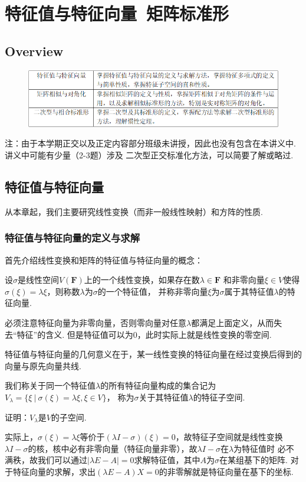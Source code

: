 \chapter{特征值与特征向量\ 矩阵标准形}

\section{Overview}
\begin{figure}[h]
	\centering
	\includegraphics[scale=0.58]{9.png}
\end{figure}
注：由于本学期正交以及正定内容部分班级未讲授，因此也没有包含在本讲义中.讲义中可能有少量（2-3题）涉及
二次型正交标准化方法，可以简要了解或略过.
\section{特征值与特征向量}
从本章起，我们主要研究线性变换（而非一般线性映射）和方阵的性质.
\subsection{特征值与特征向量的定义与求解}
首先介绍线性变换和矩阵的特征值与特征向量的概念：
\begin{definition}
	设$\sigma$是线性空间$V(\mathbf{F})$上的一个线性变换，如果存在数$\lambda\in\mathbf{F}$
	和非零向量$\xi\in V$使得$\sigma(\xi)=\lambda\xi$，则称数$\lambda$为$\sigma$的一个特征值，
	并称非零向量$\xi$为$\sigma$属于其特征值$\lambda$的特征向量.
\end{definition}
必须注意特征向量为非零向量，否则零向量对任意$\lambda$都满足上面定义，从而失去“特征”的含义.
但是特征值可以为0，此时实际上就是线性变换的零空间.

特征值与特征向量的几何意义在于，某一线性变换的特征向量在经过变换后得到的向量与原先向量共线.

我们称关于同一个特征值$\lambda$的所有特征向量构成的集合记为$V_\lambda=\{\xi\ |\ \sigma(\xi)=\lambda\xi,\xi\in V\}$，
称为$\sigma$关于其特征值$\lambda$的特征子空间.
\begin{example}
	证明：$V_\lambda$是$V$的子空间.
\end{example}
实际上，$\sigma(\xi)=\lambda\xi$等价于$(\lambda I-\sigma)(\xi)=0$，故特征子空间就是线性变换
$\lambda I-\sigma$的核，核中必有非零向量（特征向量非零），故$\lambda I-\sigma$在$\lambda$为特征值时
必不满秩，故我们可以通过$|\lambda E-A|=0$求解特征值，其中$A$为$\sigma$在某组基下的矩阵.
对于特征向量的求解，求出$(\lambda E-A)X=0$的非零解就是特征向量在基下的坐标.

